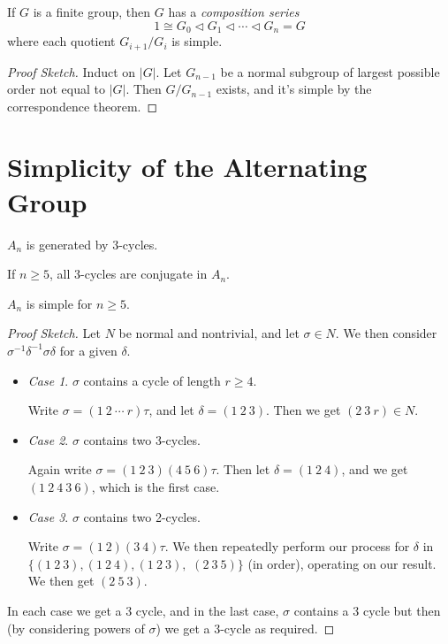 \documentclass[a4paper]{amsart}
\begin{document}
\begin{lemma}
	If $G$ is a finite group, then $G$ has a \emph{composition series}
	$$
	1 \cong G_{0} \triangleleft G_{1} \triangleleft \cdots \triangleleft G_{n}=G
	$$
	where each quotient $G_{i + 1}/G_i$ is simple.
\end{lemma}
\begin{proof}[Proof Sketch]
	Induct on $|G|$. Let $G_{n - 1}$ be a normal subgroup of largest possible order not equal to $|G|$. Then $G/G_{n - 1}$ exists, and it's simple by the correspondence theorem.
\end{proof}

\section{Simplicity of the Alternating Group}

\begin{lemma}
	$A_n$ is generated by $3$-cycles.
\end{lemma}

\begin{lemma}
	If $n \geq 5$, all $3$-cycles are conjugate in $A_n$.
\end{lemma}

\begin{theorem}
	$A_n$ is simple for $n \geq 5$.
\end{theorem}
\begin{proof}[Proof Sketch]
		Let $N$ be normal and nontrivial, and let $\sigma \in N$. We then consider $\sigma^{-1}\delta^{-1}\sigma\delta$ for a given $\delta$.
	\begin{itemize}
		\item \emph{Case 1}. $\sigma$ contains a cycle of length $r \geq 4$.
		
		Write $\sigma = (1\ 2\ \cdots\ r) \tau$, and let $\delta = (1\ 2\ 3)$. Then we get $(2\ 3\ r) \in N$.

		\item \emph{Case 2}. $\sigma$ contains two 3-cycles. 
		
		Again write $\sigma = (1\ 2\ 3)(4\ 5\ 6)\tau$. Then let $\delta = (1\ 2\ 4)$, and we get $(1\ 2\ 4\ 3\ 6)$, which is the first case.

		\item \emph{Case 3}. $\sigma$ contains two 2-cycles.
		
		Write $\sigma = (1\ 2)(3\ 4) \tau$. We then repeatedly perform our process for  $\delta$ in $\{(1\ 2\ 3), (1\ 2\ 4), (1\ 2\ 3),$ $(2\ 3\ 5)\}$ (in order), operating on our result. We then get $(2\ 5\ 3)$.
	\end{itemize}
	In each case we get a 3 cycle, and in the last case, $\sigma$ contains a 3 cycle but then (by considering powers of $\sigma$) we get a 3-cycle as required.
\end{proof}
\end{document}
